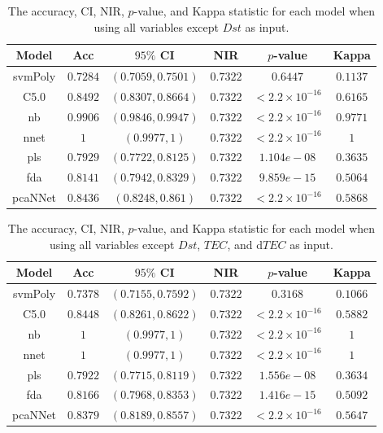 \documentclass[sn-mathphys-num]{sn-jnl}%
\begin{document}
\begin{table}[!ht]
    \centering
    \caption{The accuracy, CI, NIR, $p$-value, and Kappa statistic for each model when using all variables except $Dst$ as input.}
	\label{tab:stats:reverse:noDst}
	\begin{tabular}{|c|c|c|c|c|c|}
		\hline
		Model & Acc & $95\%$ CI & NIR & $p$-value & Kappa \\ \hline
		svmPoly & $0.7284$ & $(0.7059, 0.7501)$ & $0.7322$ & $0.6447$ & $0.1137$ \\ \hline
		C5.0 & $0.8492$ & $(0.8307, 0.8664)$ & $0.7322$ & $< 2.2 \times {10}^{-16}$ & $0.6165$ \\ \hline
		nb & $0.9906$ & $(0.9846, 0.9947)$ & $0.7322$ & $< 2.2 \times {10}^{-16}$ & $0.9771$ \\ \hline
		nnet & $1$ & $(0.9977, 1)$ & $0.7322$ & $< 2.2 \times {10}^{-16}$ & $1$ \\ \hline
		pls & $0.7929$ & $(0.7722, 0.8125)$ & $0.7322$ & $1.104e-08$ & $0.3635$ \\ \hline
		fda & $0.8141$ & $(0.7942, 0.8329)$ & $0.7322$ & $9.859e-15$ & $0.5064$ \\ \hline
		pcaNNet & $0.8436$ & $(0.8248, 0.861)$ & $0.7322$ & $< 2.2 \times {10}^{-16}$ & $0.5868$ \\ \hline
	\end{tabular}
\end{table}

\begin{table}[!ht]
    \centering
    \caption{The accuracy, CI, NIR, $p$-value, and Kappa statistic for each model when using all variables except $Dst$, $TEC$, and d$TEC$ as input.}
	\label{tab:stats:reverse:no$TEC$}
	\begin{tabular}{|c|c|c|c|c|c|}
		\hline
		Model & Acc & $95\%$ CI & NIR & $p$-value & Kappa \\ \hline
		svmPoly & $0.7378$ & $(0.7155, 0.7592)$ & $0.7322$ & $0.3168$ & $0.1066$ \\ \hline
		C5.0 & $0.8448$ & $(0.8261, 0.8622)$ & $0.7322$ & $< 2.2 \times {10}^{-16}$ & $0.5882$ \\ \hline
		nb & $1$ & $(0.9977, 1)$ & $0.7322$ & $< 2.2 \times {10}^{-16}$ & $1$ \\ \hline
		nnet & $1$ & $(0.9977, 1)$ & $0.7322$ & $< 2.2 \times {10}^{-16}$ & $1$ \\ \hline
		pls & $0.7922$ & $(0.7715, 0.8119)$ & $0.7322$ & $1.556e-08$ & $0.3634$ \\ \hline
		fda & $0.8166$ & $(0.7968, 0.8353)$ & $0.7322$ & $1.416e-15$ & $0.5092$ \\ \hline
		pcaNNet & $0.8379$ & $(0.8189, 0.8557)$ & $0.7322$ & $< 2.2 \times {10}^{-16}$ & $0.5647$ \\ \hline
	\end{tabular}
\end{table}
\end{document}

